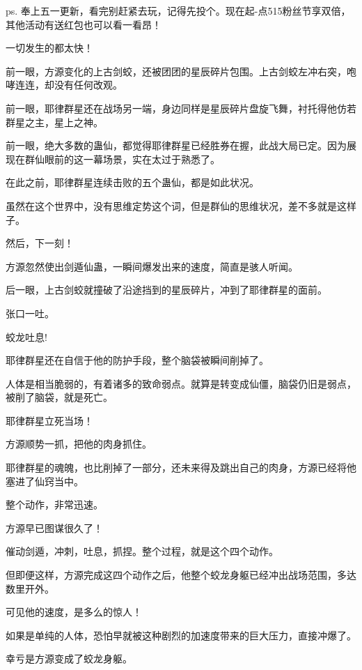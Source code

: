 
\begin{this_body}



ps. 奉上五一更新，看完别赶紧去玩，记得先投个。现在起-点515粉丝节享双倍，其他活动有送红包也可以看一看昂！

一切发生的都太快！

前一眼，方源变化的上古剑蛟，还被团团的星辰碎片包围。上古剑蛟左冲右突，咆哮连连，却没有任何改观。

前一眼，耶律群星还在战场另一端，身边同样是星辰碎片盘旋飞舞，衬托得他仿若群星之主，星上之神。

前一眼，绝大多数的蛊仙，都觉得耶律群星已经胜券在握，此战大局已定。因为展现在群仙眼前的这一幕场景，实在太过于熟悉了。

在此之前，耶律群星连续击败的五个蛊仙，都是如此状况。

虽然在这个世界中，没有思维定势这个词，但是群仙的思维状况，差不多就是这样子。

然后，下一刻！

方源忽然使出剑遁仙蛊，一瞬间爆发出来的速度，简直是骇人听闻。

后一眼，上古剑蛟就撞破了沿途挡到的星辰碎片，冲到了耶律群星的面前。

张口一吐。

蛟龙吐息!

耶律群星还在自信于他的防护手段，整个脑袋被瞬间削掉了。

人体是相当脆弱的，有着诸多的致命弱点。就算是转变成仙僵，脑袋仍旧是弱点，被削了脑袋，就是死亡。

耶律群星立死当场！

方源顺势一抓，把他的肉身抓住。

耶律群星的魂魄，也比削掉了一部分，还未来得及跳出自己的肉身，方源已经将他塞进了仙窍当中。

整个动作，非常迅速。

方源早已图谋很久了！

催动剑遁，冲刺，吐息，抓捏。整个过程，就是这个四个动作。

但即便这样，方源完成这四个动作之后，他整个蛟龙身躯已经冲出战场范围，多达数里开外。

可见他的速度，是多么的惊人！

如果是单纯的人体，恐怕早就被这种剧烈的加速度带来的巨大压力，直接冲爆了。

幸亏是方源变成了蛟龙身躯。


\end{this_body}
